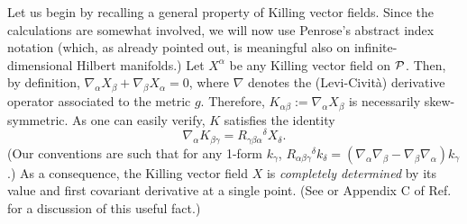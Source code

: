 \documentclass[12pt,aps,eqsecnum,tighten]{revtex4-2}
\def\be{\begin{equation}}
\def\ee{\end{equation}}
\def\a{\alpha}
\def\b{\beta}
\def\c{\gamma}
\def\de{\delta}
\def\grad{\nabla}
\def\P{{\cal P}}
\begin{document}
Let us begin by recalling a general property of Killing vector fields.
Since the calculations are somewhat involved, we will now use
Penrose's abstract index notation (which, as already pointed out, is
meaningful also on infinite-dimensional Hilbert manifolds.)  Let
$X^\a$ be any Killing vector field on $\P$.  Then, by definition,
$\grad_\a X_\b + \grad_\b X_\a = 0$, where $\grad$ denotes the
(Levi-Civit\`a) derivative operator associated to the metric $g$.
Therefore, $K_{\a\b} := \grad_\a X_\b$ is necessarily skew-symmetric.
As one can easily verify,\cite{wald} $K$ satisfies the identity%
%
\be
\grad_\a K_{\b\c} = R_{\c\b\a}{}^\de X_\de.
\ee
%
(Our conventions are such that for any 1-form $k_\c$,
$R_{\a\b\c}{}^\delta k_\delta = (\grad_\a \grad_\b - \grad_\b
\grad_\a) k_\c$.)  As a consequence, the Killing vector field $X$ is
{\em completely determined} by its value and first covariant
derivative at a single point.  (See \cite{ashtekar} or Appendix C of
Ref.~\cite{wald} for a discussion of this useful fact.)
\end{document}
